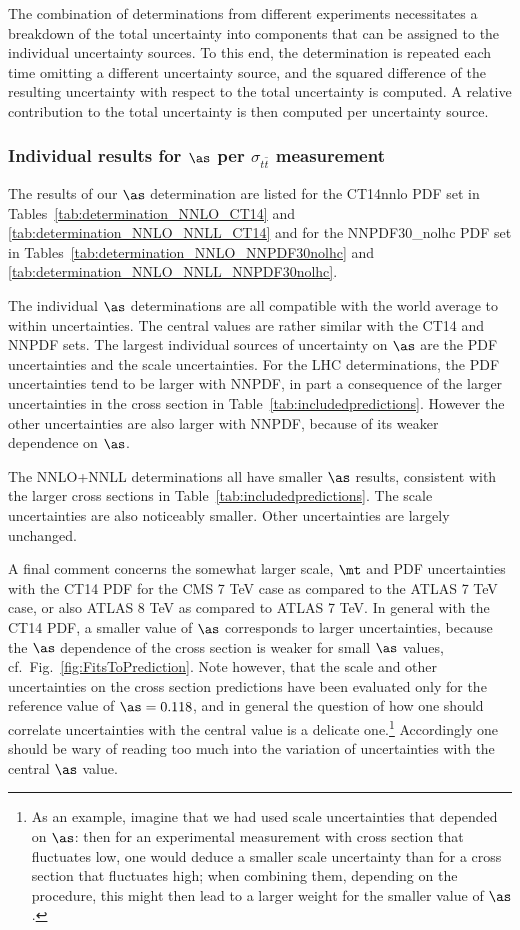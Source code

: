 The combination of determinations from different experiments
necessitates a breakdown of the total uncertainty into components that
can be assigned to the individual uncertainty sources.  To this end,
the determination is repeated each time omitting a different
uncertainty source, and the squared difference of the resulting
uncertainty with respect to the total uncertainty is computed.  A
relative contribution to the total uncertainty is then computed per
uncertainty source. 

\subsubsection{Individual results for $\as$ per $\sigma_{t\bar t}$ measurement}
\label{sec:results-by-exp}

The results of our $\as$ determination are listed for the CT14nnlo
PDF set in Tables~\ref{tab:determination_NNLO_CT14} and
\ref{tab:determination_NNLO_NNLL_CT14} and for the
NNPDF30\_nolhc PDF set in
Tables~\ref{tab:determination_NNLO_NNPDF30nolhc} and
\ref{tab:determination_NNLO_NNLL_NNPDF30nolhc}.

The individual $\as$ determinations are all compatible with the world
average to within uncertainties.
%
The central values are rather similar with the CT14 and NNPDF sets.
%
The largest individual sources of uncertainty on $\as$ are the PDF
uncertainties and the scale uncertainties.
%
For the LHC determinations, the PDF uncertainties tend to be larger
with NNPDF, in part a consequence of the larger uncertainties in the
cross section in Table~\ref{tab:includedpredictions}. 
%
However the other uncertainties are also larger with NNPDF, because
of its weaker dependence on $\as$.

The NNLO+NNLL determinations all have smaller $\as$ results,
consistent with the larger cross sections in
Table~\ref{tab:includedpredictions}.
%
The scale uncertainties are also noticeably smaller.
%
Other uncertainties are largely unchanged.

A final comment concerns the somewhat larger scale, $\mt$ and PDF
uncertainties with the CT14 PDF for the CMS 7 TeV case as compared to
the ATLAS 7 TeV case, or also ATLAS 8 TeV as compared to ATLAS 7 TeV.
%
In general with the CT14 PDF, a smaller value of $\as$ corresponds to
larger uncertainties, because the $\as$ dependence of the cross
section is weaker for small $\as$ values,
cf.~Fig.~\ref{fig:FitsToPrediction}. 
%
Note however, that the scale and other uncertainties on the cross
section predictions have been evaluated only for the reference value
of $\as=0.118$, and in general the question of how one should
correlate uncertainties with the central value is a delicate
one.\footnote{As an example, imagine that we had used scale
  uncertainties that depended on $\as$: then for an experimental
  measurement with cross section that fluctuates low, one would deduce
  a smaller scale uncertainty than for a cross section that fluctuates
  high; when combining them, depending on the procedure, this might
  then lead to a larger weight for the smaller value of $\as$.}
%
Accordingly one should be wary of reading too much into the variation
of uncertainties with the central $\as$ value.

